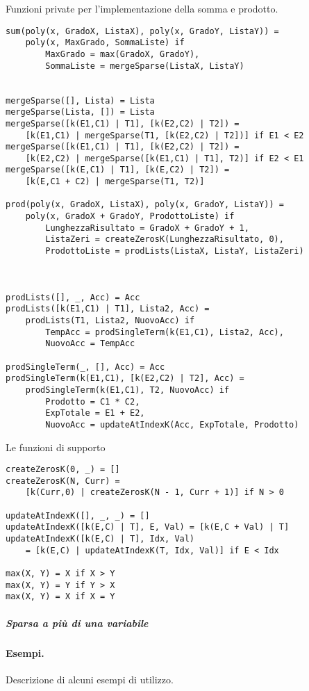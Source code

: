 \documentclass[12pt,twoside]{report}
\begin{document}
Funzioni private per l'implementazione della somma e prodotto.
\begin{lstlisting}
sum(poly(x, GradoX, ListaX), poly(x, GradoY, ListaY)) = 
    poly(x, MaxGrado, SommaListe) if
        MaxGrado = max(GradoX, GradoY),
        SommaListe = mergeSparse(ListaX, ListaY)


mergeSparse([], Lista) = Lista
mergeSparse(Lista, []) = Lista
mergeSparse([k(E1,C1) | T1], [k(E2,C2) | T2]) = 
    [k(E1,C1) | mergeSparse(T1, [k(E2,C2) | T2])] if E1 < E2
mergeSparse([k(E1,C1) | T1], [k(E2,C2) | T2]) = 
    [k(E2,C2) | mergeSparse([k(E1,C1) | T1], T2)] if E2 < E1
mergeSparse([k(E,C1) | T1], [k(E,C2) | T2]) = 
    [k(E,C1 + C2) | mergeSparse(T1, T2)]

prod(poly(x, GradoX, ListaX), poly(x, GradoY, ListaY)) = 
    poly(x, GradoX + GradoY, ProdottoListe) if
        LunghezzaRisultato = GradoX + GradoY + 1,
        ListaZeri = createZerosK(LunghezzaRisultato, 0),
        ProdottoListe = prodLists(ListaX, ListaY, ListaZeri)



prodLists([], _, Acc) = Acc
prodLists([k(E1,C1) | T1], Lista2, Acc) = 
    prodLists(T1, Lista2, NuovoAcc) if
        TempAcc = prodSingleTerm(k(E1,C1), Lista2, Acc),
        NuovoAcc = TempAcc

prodSingleTerm(_, [], Acc) = Acc
prodSingleTerm(k(E1,C1), [k(E2,C2) | T2], Acc) = 
    prodSingleTerm(k(E1,C1), T2, NuovoAcc) if
        Prodotto = C1 * C2,
        ExpTotale = E1 + E2,
        NuovoAcc = updateAtIndexK(Acc, ExpTotale, Prodotto)
\end{lstlisting}

Le funzioni di supporto
\begin{lstlisting}
createZerosK(0, _) = []
createZerosK(N, Curr) = 
    [k(Curr,0) | createZerosK(N - 1, Curr + 1)] if N > 0

updateAtIndexK([], _, _) = []
updateAtIndexK([k(E,C) | T], E, Val) = [k(E,C + Val) | T]
updateAtIndexK([k(E,C) | T], Idx, Val) 
    = [k(E,C) | updateAtIndexK(T, Idx, Val)] if E < Idx

max(X, Y) = X if X > Y
max(X, Y) = Y if Y > X
max(X, Y) = X if X = Y
\end{lstlisting}

\subparagraph{Sparsa a più di una variabile}

\paragraph{Esempi.} Descrizione di alcuni esempi di utilizzo.
\end{document}

